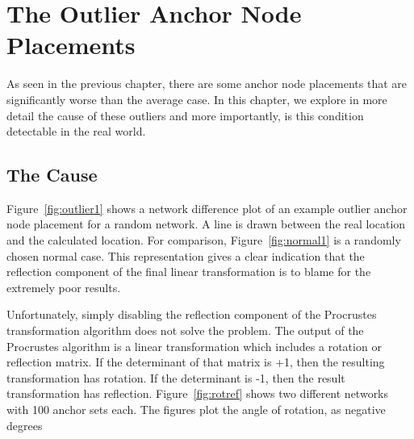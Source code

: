 \chapter{The Outlier Anchor Node Placements}
As seen in the previous chapter, there are some anchor node placements that are significantly worse than the average case.   In this chapter, we explore in more detail the cause of these outliers and more importantly, is this condition detectable in the real world.

\section{The Cause}
Figure~\ref{fig:outlier1} shows a network difference plot of an example outlier anchor node placement for a random network. A line is drawn between the real location and the calculated location.  For comparison, Figure~\ref{fig:normal1} is a randomly chosen normal case. This representation gives a clear indication that the reflection component of the final linear transformation is to blame for the extremely poor results.  

\begin{figure}
  \centering
	\label{}
	\caption{}
\end{figure}

Unfortunately, simply disabling the reflection component of the Procrustes transformation algorithm does not solve the problem.  The output of the Procrustes algorithm is a linear transformation which includes a rotation or reflection matrix.  If the determinant of that matrix is +1, then the resulting transformation has rotation.  If the determinant is -1, then the result transformation has reflection. Figure~\ref{fig:rotref} shows two different networks with 100 anchor sets each.  The figures plot the angle of rotation, as negative degrees

